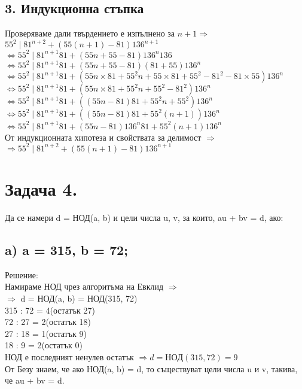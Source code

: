 \documentclass[12pt]{article}
\begin{document}
\subsection*{3. Индукционна стъпка}
Проверяваме дали твърдението е изпълнено за $n+1 \Rightarrow$\\
$55^2 \mid 81^{n+2} + (55(n + 1) -81)136^{n+1}$\\
$\Leftrightarrow 55^2 \mid 81^{n + 1}81 + (55n + 55 - 81)136^n136$\\
$\Leftrightarrow 55^2 \mid 81^{n + 1}81 + (55n + 55 - 81)(81 + 55)136^n$\\
$\Leftrightarrow 55^2 \mid 81^{n + 1}81 + (55n \times 81 + 55^2n + 55 \times 81 + 55^2 - 81^2 - 81 \times 55)136^n$\\
$\Leftrightarrow 55^2 \mid 81^{n + 1}81 + (55n \times 81 + 55^2n + 55^2 - 81^2)136^n$\\
$\Leftrightarrow 55^2 \mid 81^{n + 1}81 + ((55n - 81)81  + 55^2n + 55^2)136^n$\\
$\Leftrightarrow 55^2 \mid 81^{n + 1}81 + ((55n - 81)81  + 55^2(n + 1))136^n$\\
$\Leftrightarrow 55^2 \mid 81^{n + 1}81 + (55n - 81)136^n81  + 55^2(n + 1)136^n$\\
От индукционната хипотеза и свойствата за делимост $\Rightarrow$\\
$\Rightarrow 55^2 \mid 81^{n+2} + (55(n + 1) -81)136^{n+1}$

\section*{Задача 4.}
Да се намери d = НОД(a, b) и цели числа u, v, за които, au + bv = d, ако:\\
\subsection*{a) a = 315, b = 72;}
Решение:\\
Намираме НОД чрез алгоритъма на Евклид $\Rightarrow$\\
$\Rightarrow$ d = НОД(a, b) = НОД(315, 72)\\
315 : 72 = 4(остатък 27)\\
72 : 27 = 2(остатък 18)\\
27 : 18 = 1(остатък 9)\\
18 : 9 = 2(остатък 0)\\
НОД е последният ненулев остатък $\Rightarrow d = НОД(315, 72) = 9$\\
От Безу знаем, че ако НОД(a, b) = d, то съществуват цели числа u и v, такива, че au + bv = d.\\
\end{document}
